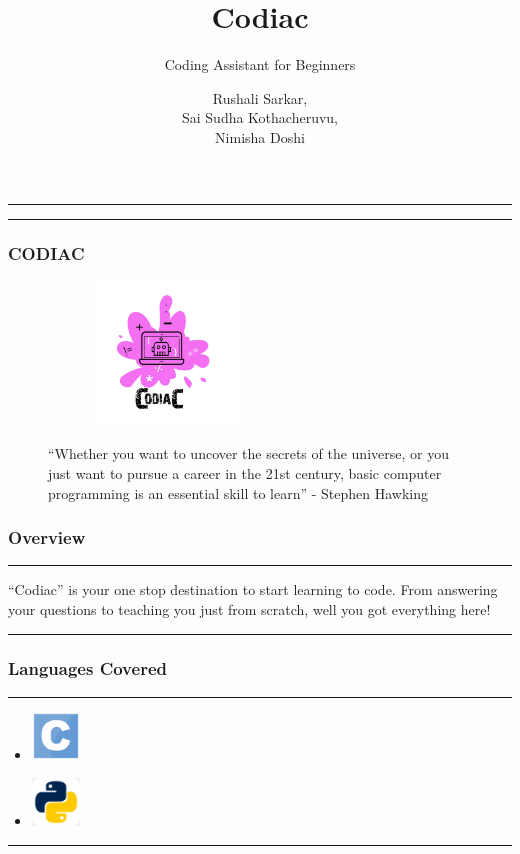 \documentclass[14pt]{beamer}
\title[Codiac]{Codiac}
\subtitle[Coding Assitant]{Coding Assistant for Beginners}
\author[Team 2]{Rushali Sarkar, \\ Sai Sudha Kothacheruvu, \\ Nimisha Doshi}
\begin{document}
\begin{frame}
    \noindent
    {\color{pink} \rule{\linewidth}{0.7mm} }
    \titlepage
    \noindent
    {\color{pink} \rule{\linewidth}{0.7mm} }
\end{frame}


\begin{frame}
    \frametitle{CODIAC}
    \begin{figure}[htbp]
        \centerline{\includegraphics[width=2.5in, height=1.5in]{./logos/logo.jpeg}}
        \begin{spacing}{0.25}
        {\small 
        ``Whether you want to uncover the secrets of the universe, 
        or you just want to pursue a career in the 21st century, 
        basic computer programming is an essential skill to learn'' 
        \linebreak - Stephen Hawking}
        \end{spacing}
    \end{figure}
\end{frame}


\begin{frame}
    \frametitle{Overview}
    \noindent
    {\color{pink} \rule{\linewidth}{0.7mm} }
    ``Codiac'' is your one stop destination to start learning to code. From answering your questions to teaching you just from scratch, well you got everything here!
    \noindent
    {\color{pink} \rule{\linewidth}{0.7mm} }
\end{frame}

\begin{frame}
    \frametitle{Languages Covered}
    \noindent
     {\color{pink} \rule{\linewidth}{1mm} }
    \begin{itemize}
        \item [] \includegraphics[width=0.5in, height=0.5in]{./logos/c.png}\hspace{1cm}{\huge C} \\
            \pause
        \item [] \includegraphics[width=0.5in, height=0.5in]{./logos/python.png}\hspace{1cm}{\huge Python} \\
    \end{itemize}
\noindent
    {\color{pink} \rule{\linewidth}{1mm} }
\end{frame}
\end{document}
